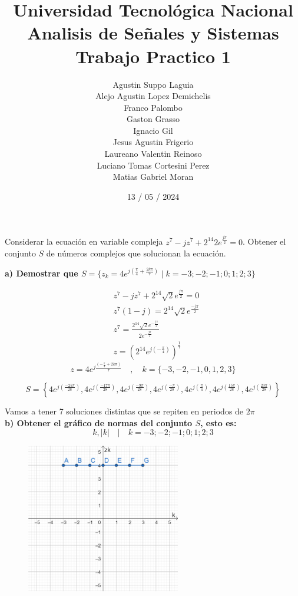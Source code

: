 \documentclass[12pt,a4paper]{report}
\title{%
  \fontsize{25}{0}\selectfont Universidad Tecnológica Nacional \\
  \fontsize{22}{30}\selectfont Analisis de Señales y Sistemas \\
  \fontsize{20}{25}\selectfont Trabajo Practico 1
}
\author{
Agustin Suppo Laguia\\
Alejo Agustin Lopez Demichelis\\
Franco Palombo\\
Gaston Grasso\\
Ignacio Gil\\
Jesus Agustin Frigerio\\
Laureano Valentin Reinoso\\
Luciano Tomas Cortesini Perez\\
Matias Gabriel Moran\\
}
\date{13 / 05 / 2024}
\begin{document}
\maketitle

\chapter{}%
Considerar la ecuación en variable compleja $z^7-jz^7+2^{14}2e^{\frac{j\pi}{2}}=0$.
Obtener el conjunto $S$ de números complejos que solucionan la ecuación.

\textbf{a) Demostrar que  $S = \{z_k = 4e^{j(\frac{\pi}{4}+\frac{2k\pi}{7})} \mid k=-3;-2;-1;0;1;2;3\}$}

\begin{align*}
&z^7 - jz^7 + 2^{14}\sqrt{2}e^{\frac{j\pi}{2}} = 0\\
&z^7(1-j) = 2^{14}\sqrt{2}e^{\frac{-j\pi}{2}}\\
&z^7 = \frac{2^{14}\sqrt{2}e^{-\frac{j\pi}{2}}} {2e^{-\frac{j\pi}{4}}}\\
&z = (2^{14}e^{j(-\frac{\pi} {4})})^{\frac{1}{7}}
\end{align*}
$$z = 4e^{j\frac{(-\frac{\pi}{4}+2k\pi)}{7}} \quad,\quad k = \{-3,-2,-1,0,1,2,3\}$$

$$
S = \left\{ 4e^{j \left( \frac{-25 \pi}{28} \right)}, 4e^{j \left( \frac{-17 \pi}{28} \right)}, 4e^{j \left( \frac{-9 \pi}{28} \right)}, 4e^{j \left( \frac{-\pi}{28} \right)}, 4e^{j \left( \frac{\pi}{4} \right)}, 4e^{j \left( \frac{15 \pi}{28} \right)}, 4e^{j \left( \frac{23 \pi}{28} \right)} \right\}
$$

Vamos a tener 7 soluciones distintas que se repiten en periodos de $2\pi$\\

\textbf{b) Obtener el gráfico de normas del conjunto $S$, esto es:}
    $$k, |k| \quad | \quad k = -3;-2;-1;0;1;2;3 $$
\begin{figure}[h] %
    \centering %
    \includegraphics[width=0.6\textwidth]{./Imagenes/foto1Ej1.png} %
\end{figure}
\end{document}
